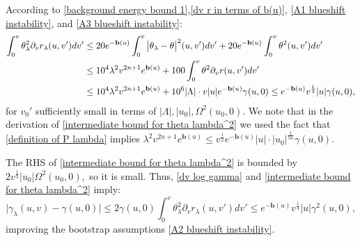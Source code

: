 \documentclass[11pt]{article}
\numberwithin{equation}{section}
\begin{document}
According to \eqref{background energy bound 1},\eqref{dv r in terms of b(u)}, \eqref{A1 blueshift instability}, and \eqref{A3 blueshift instability}:
\begin{align}\label{intermediate bound for theta lambda^2}
    \int_0^v\theta_{\lambda}^2\partial_vr_{\lambda}(u,v')dv'&\leq20e^{-\mathbf{b}(u)}\int_0^v\big|\theta_{\lambda}-\theta\big|^2(u,v')dv'+20e^{-\mathbf{b}(u)}\int_0^v\theta^2(u,v')dv'\\
    &\leq10^4\lambda^2v^{2n+1}e^{\mathbf{b}(u)}+100\int_0^v\theta^2\partial_vr(u,v')dv'\notag\\
    &\leq10^4\lambda^2v^{2n+1}e^{\mathbf{b}(u)}+10^6|\Lambda|\cdot v|u|e^{-\mathbf{b}(u)}\gamma(u,0)\leq e^{-\mathbf{b}(u)}v^{\frac{1}{3}}|u|\gamma(u,0),\notag
\end{align}
for $v_0'$ sufficiently small in terms of $|\Lambda|,|u_0|,\Omega^2(u_0,0).$ We note that in the derivation of \eqref{intermediate bound for theta lambda^2} we used the fact that \eqref{definition of P lambda} implies $\lambda^2v^{2n+1}e^{\mathbf{b}(u)}\leq v^{\frac{1}{2}}e^{-\mathbf{b}(u)}|u|\cdot|u_0|^{\frac{1}{5n}}\gamma(u,0).$ 

The RHS of \eqref{intermediate bound for theta lambda^2} is bounded by $2v^{\frac{1}{3}}|u_0|\Omega^2(u_0,0),$ so it is small. Thus, \eqref{dv log gamma} and \eqref{intermediate bound for theta lambda^2} imply:
\[\big|\gamma_{\lambda}(u,v)-\gamma(u,0)\big|\leq2\gamma(u,0)\int_0^v\theta_{\lambda}^2\partial_vr_{\lambda}(u,v')dv'\leq e^{-\mathbf{b}(u)}v^{\frac{1}{4}}|u|\gamma^2(u,0),\]
improving the bootstrap assumptions \eqref{A2 blueshift instability}.
\end{document}

